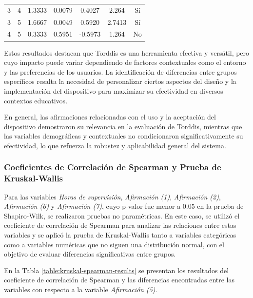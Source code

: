 \begin{itemize}
\begin{table}[ht]
\begin{tabularx}{0.75\textwidth}{ccccccc}
						\hline
						3 & 4 & 1.3333 & 0.0079 & 0.4027 & 2.264 & Sí \\
						3 & 5 & 1.6667 & 0.0049 & 0.5920 & 2.7413 & Sí \\
						4 & 5 & 0.3333 & 0.5951 & -0.5973 & 1.264 & No \\
						\hline
					\end{tabularx}
					\label{table:posthoc_6y7}
				\end{table}
				\end{itemize}
				
				Estos resultados destacan que Torddis es una herramienta efectiva y versátil, pero cuyo impacto puede variar dependiendo de factores contextuales como el entorno y las preferencias de los usuarios. La identificación de diferencias entre grupos específicos resalta la necesidad de personalizar ciertos aspectos del diseño y la implementación del dispositivo para maximizar su efectividad en diversos contextos educativos.
				
				En general, las afirmaciones relacionadas con el uso y la aceptación del dispositivo demostraron su relevancia en la evaluación de Torddis, mientras que las variables demográficas y contextuales no condicionaron significativamente su efectividad, lo que refuerza la robustez y aplicabilidad general del sistema.
			
			\subsubsection{Coeficientes de Correlación de Spearman y Prueba de Kruskal-Wallis}
				Para las variables \textit{Horas de supervisión}, \textit{Afirmación (1)}, \textit{Afirmación (2)}, \textit{Afirmación (6)} y \textit{Afirmación (7)}, cuyo p-valor fue menor a 0.05 en la prueba de Shapiro-Wilk, se realizaron pruebas no paramétricas. En este caso, se utilizó el coeficiente de correlación de Spearman para analizar las relaciones entre estas variables y se aplicó la prueba de Kruskal-Wallis tanto a variables categóricas como a variables numéricas que no siguen una distribución normal, con el objetivo de evaluar diferencias significativas entre grupos.
				
				En la Tabla \ref{table:kruskal-spearman-results} se presentan los resultados del coeficiente de correlación de Spearman y las diferencias encontradas entre las variables con respecto a la variable \textit{Afirmación (5)}.
				
